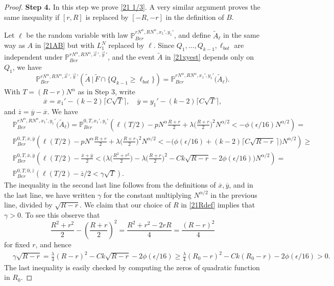 \begin{proof}
		\noindent\textbf{Step 4.} In this step we prove \eqref{21 1/3}. A very similar argument proves the same inequality if $[r,R]$ is replaced by $[-R,-r]$ in the definition of $B$. 
		
		Let $\ell$ be the random variable with law $\mathbb{P}^{rN^\alpha,RN^\alpha,x_1',y_1'}_{Ber}$, and define $\tilde{A}_\ell$ in the same way as $A$ in \eqref{21AB} but with $L_1^N$ replaced by $\ell$. Since $Q_1,\dots,Q_{k-1},\ell_{bot}$ are independent under $\mathbb{P}^{rN^\alpha, RN^\alpha,\vec{x}\,',\vec{y}\,'}_{Ber}$, and the event $\tilde A$ in \eqref{21xyest} depends only on $Q_1$, we have
		\begin{equation}\label{21indep}
		\mathbb{P}^{rN^\alpha, RN^\alpha,\vec{x}\,',\vec{y}\,'}_{Ber}\left(\tilde A\,\big|\,\tilde F\cap \{ Q_{k-1} \geq \ell_{bot}\}\right) = \mathbb{P}^{rN^\alpha, RN^\alpha,x_1',y_1'}_{Ber}\big(\tilde{A}_\ell\big).
		\end{equation} 
		With $T=(R-r)N^\alpha$ as in Step 3, write
		\[
		\overline{x} = x_1' - (k-2)\lceil C\sqrt{T}\rceil, \quad \overline{y} = y_1' - (k-2)\lceil C\sqrt{T}\rceil,
		\] 
		and $\overline{z} = \overline{y}-\overline{x}$. We have
		\begin{equation} \label{21convex}
		\begin{split}
		& \mathbb{P}^{rN^\alpha, RN^\alpha,x_1',y_1'}_{Ber} \big(\tilde A_\ell\big)
		= \mathbb{P}^{0,T,x_1',y_1'}_{Ber} \left(\ell(T/2) - pN^\alpha \frac{R+r}{2} + \lambda\Big(\frac{R+r}{2}\Big)^2 N^{\alpha/2} < -\phi(\epsilon/16)N^{\alpha/2}\right) =\\
		& \mathbb{P}^{0,T,\overline{x},\overline{y}}_{Ber}\left(\ell(T/2) - pN^\alpha\frac{R+r}{2} + \lambda\Big(\frac{R+r}{2}\Big)^2 N^{\alpha/2} < -\big(\phi(\epsilon/16) + (k-2)\lceil C\sqrt{R-r}\,\rceil\big)N^{\alpha/2}\right) \geq\\
		& \mathbb{P}^{0,T,\overline{x},\overline{y}}_{Ber}\left(\ell(T/2) - \frac{\overline{x} + \overline{y}}{2} < \Big( \lambda\Big(\frac{R^2+r^2}{2}\Big) - \lambda\Big(\frac{R+r}{2}\Big)^2 - Ck\sqrt{R-r} - 2\phi(\epsilon/16)\Big)N^{\alpha/2}\right) = \\
		&\mathbb{P}^{0,T,0,\overline{z}}_{Ber}\left(\ell(T/2) - \overline{z}/2 < \gamma\sqrt{T}\right).
		\end{split}
		\end{equation}
		The inequality in the second last line follows from the definitions of $\overline{x},\overline{y}$, and in the last line, we have written $\gamma$ for the constant multiplying $N^{\alpha/2}$ in the previous line, divided by $\sqrt{R-r}$. We claim that our choice of $R$ in \eqref{21Rdef} implies that $\gamma > 0$. To see this observe that
		\[
		\frac{R^2+r^2}{2} - \left(\frac{R+r}{2}\right)^2 = \frac{R^2 + r^2-2rR}{4} = \frac{(R-r)^2}{4}
		\]
		for fixed $r$, and hence
		\begin{align*}
		&\gamma\sqrt{R-r} = \frac{\lambda}{4}(R-r)^2 - Ck\sqrt{R-r} - 2\phi(\epsilon/16) \geq \frac{\lambda}{4}(R_0-r)^2 - Ck(R_0-r) - 2\phi(\epsilon/16) > 0.
		\end{align*} 
		The last inequality is easily checked by computing the zeros of quadratic function in $R_0$.
		

\end{proof}
